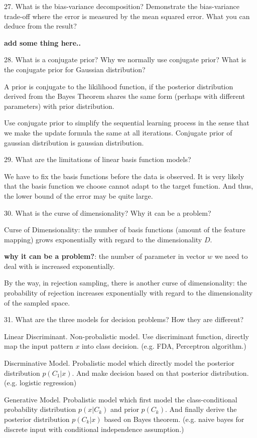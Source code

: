 \documentclass[11pt,a4paper]{article}
\newcommand{\BOLD}[1]{\textbf{#1}}
\begin{document}
27. What is the bias-variance decomposition? Demonstrate the bias-variance trade-off where the error is measured by the mean squared error. What you can deduce from the result?
    
    \BOLD{\huge add some thing here..}

28. What is a conjugate prior? Why we normally use conjugate prior? What is the conjugate prior for Gaussian distribution?

A prior is conjugate to the likilihood function, if the posterior distribution derived from the Bayes Theorem shares the same form (perhaps with different parameters) with prior distribution. 

    Use conjugate prior to simplify the sequential learning process in the sense that we make the update formula the same at all iterations. 
    Conjugate prior of gaussian distribution is gaussian distribution.

29. What are the limitations of linear basis function models? 

    We have to fix the basis functions before the data is observed. It is very likely that the basis function we choose cannot adapt to the target function. And thus, the lower bound of the error may be quite large.

30. What is the curse of dimensionality? Why it can be a problem?
    
Curse of Dimensionality: the number of basis functions (amount of the feature mapping) grows exponentially with regard to the dimensionality $D$.

\BOLD{why it can be a problem?}: the number of parameter in vector $w$ we need to deal with is increased exponentially. 

By the way, in rejection sampling, there is another curse of dimensionality: the probability of rejection increases exponentially with regard to the dimensionality of the sampled space.

31. What are the three models for decision problems? How they are different?
    
    Linear Discriminant. Non-probalistic model. Use discriminant function, directly map the input pattern $x$ into class decision. (e.g. FDA, Perceptron algorithm.)

    Discrminative Model. Probalistic model which directly model the posterior distribution $p(C_1|x)$. And make decision based on that posterior distribution. (e.g. logistic regression)

    Generative Model. Probalistic model which first model the class-conditional probability distribution $p(x|C_k)$ and prior $p(C_k)$. And finally derive the posterior distribution $p(C_k|x)$ based on Bayes theorem. (e.g. naive bayes for discrete input with conditional independence assumption.)
    
\end{document}
